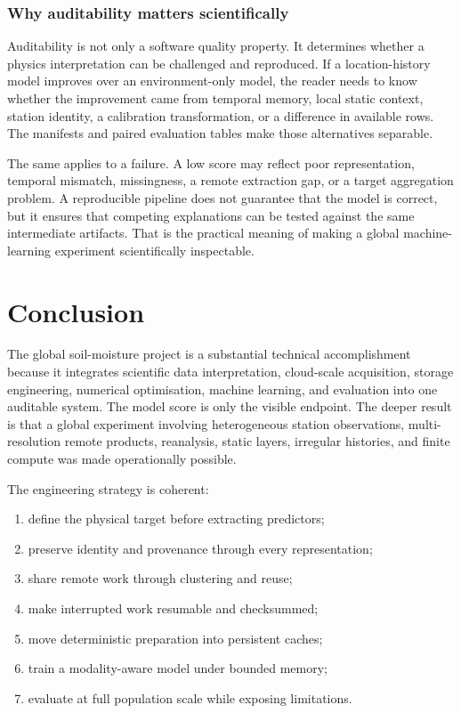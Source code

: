 \documentclass[12pt,a4paper]{report}
\begin{document}
\subsection{Why auditability matters scientifically}
Auditability is not only a software quality property. It determines whether a
physics interpretation can be challenged and reproduced. If a location-history
model improves over an environment-only model, the reader needs to know
whether the improvement came from temporal memory, local static context,
station identity, a calibration transformation, or a difference in available
rows. The manifests and paired evaluation tables make those alternatives
separable.

The same applies to a failure. A low score may reflect poor representation,
temporal mismatch, missingness, a remote extraction gap, or a target aggregation
problem. A reproducible pipeline does not guarantee that the model is correct,
but it ensures that competing explanations can be tested against the same
intermediate artifacts. That is the practical meaning of making a global
machine-learning experiment scientifically inspectable.

\chapter{Conclusion}

The global soil-moisture project is a substantial technical accomplishment because it
integrates scientific data interpretation, cloud-scale acquisition, storage
engineering, numerical optimisation, machine learning, and evaluation into one
auditable system. The model score is only the visible endpoint. The deeper
result is that a global experiment involving heterogeneous station
observations, multi-resolution remote products, reanalysis, static layers,
irregular histories, and finite compute was made operationally possible.

The engineering strategy is coherent:
\begin{enumerate}
    \item define the physical target before extracting predictors;
    \item preserve identity and provenance through every representation;
    \item share remote work through clustering and reuse;
    \item make interrupted work resumable and checksummed;
    \item move deterministic preparation into persistent caches;
    \item train a modality-aware model under bounded memory;
    \item evaluate at full population scale while exposing limitations.
\end{enumerate}
\end{document}
